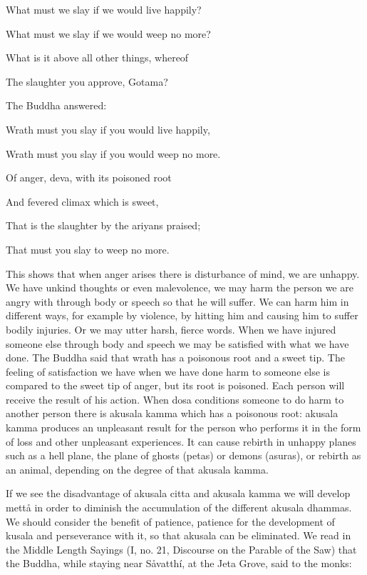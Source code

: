 \documentclass[12pt,twoside]{article}
\begin{document}
What must we slay if we would live happily?

What must we slay if we would weep no more?

What is it above all other things, whereof

The slaughter you approve, Gotama?


\bigskip

The Buddha answered:


\bigskip

Wrath must you slay if you would live happily, 

Wrath must you slay if you would weep no more. 

Of anger, deva, with its poisoned root

And fevered climax which is sweet, 

That is the slaughter by the ariyans praised;

That must you slay to weep no more. 


\bigskip

This shows that when anger arises there is disturbance of mind, we are
unhappy. We have unkind thoughts or even malevolence, we may harm the
person we are angry with through body or speech so that he will suffer.
We can harm him in different ways, for example by violence, by hitting
him and causing him to suffer bodily injuries. Or we may utter harsh,
fierce words. When we have injured someone else through body and speech
we may be satisfied with what we have done. The Buddha said that wrath
has a poisonous root and a sweet tip. The feeling of satisfaction we
have when we have done harm to someone else is compared to the sweet
tip of anger, but its root is poisoned. Each person will receive the
result of his action. When dosa conditions someone to do harm to
another person there is akusala kamma which has a poisonous root:
akusala kamma produces an unpleasant result for the person who performs
it in the form of loss and other unpleasant experiences. It can cause
rebirth in unhappy planes such as a hell plane, the plane of ghosts
(petas) or demons (asuras), or rebirth as an animal, depending on the
degree of that akusala kamma. 

If we see the disadvantage of akusala citta and akusala kamma we will
develop mett{\aa} in order to diminish the accumulation of the
different akusala dhammas. We should consider the benefit of patience,
patience for the development of kusala and perseverance with it, so
that akusala can be eliminated. We read in the Middle Length Sayings
(I, no. 21, Discourse on the Parable of the Saw) that the Buddha, while
staying near S{\aa}vatth\'i, at the Jeta Grove, said to the monks:
\end{document}
